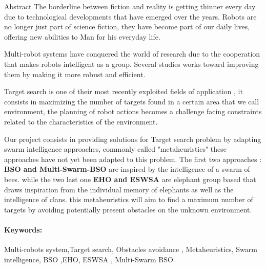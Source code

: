 \begin{poliabstract}{Abstract}
	The borderline between fiction and reality is getting thinner every day due to technological developments that have emerged over the years. Robots are no longer just part of science fiction, they have become part of our daily lives, offering new abilities to Man for his everyday life.
	
	Multi-robot systems have conquered the world of research due to the cooperation that makes robots intelligent as a group. Several studies works toward improving them by making it more robust and efficient.
	
	Target search is one of their most recently exploited fields of application , it consists in maximizing the number of targets found in a certain area that we call environment, the planning of robot actions becomes a challenge facing constraints related to the characteristics of the environment.
	
	Our project consists in providing solutions for Target search problem by adapting swarm intelligence approaches, commonly called "metaheuristics" these approaches have not yet been adapted to this problem. The first two approaches :
	\textbf{BSO and Multi-Swarm-BSO} are inspired by the intelligence of a swarm of bees. 
	while the two last one \textbf{EHO and ESWSA} are elephant group based that draws inspiration from the individual memory of elephants as well as the intelligence of clans.
	this metaheuristics will aim to find a maximum number of targets by avoiding potentially present obstacles on the unknown environment.
	\paragraph{Keywords:} 	Multi-robots system,Target search, Obstacles avoidance , Metaheuristics, Swarm intelligence, BSO ,EHO, ESWSA , Multi-Swarm BSO.
\end{poliabstract}


